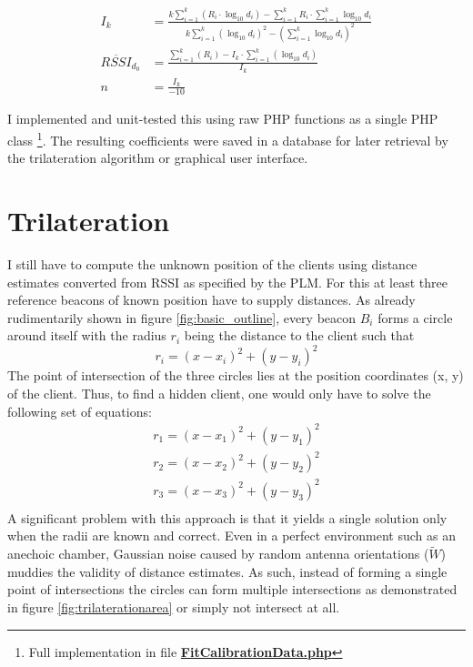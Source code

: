 \documentclass[a4paper, oneside]{ipsreport}
\begin{document}
\begin{equation}
	\label{eq:LSFforcoefficients}
	\begin{split}
		I_k &= \frac{k \sum_{i=1}^k (R_i \cdot \log_{10}{d_i}) - \sum_{i=1}^k R_i \cdot \sum_{i=1}^k \log_{10}{d_i}} {k \sum_{i=1}^k (\log_{10}{d_i})^2 - (\sum_{i=1}^k \log_{10}{d_i})^2} 	\\
		\overline{RSSI}_{d_0} &=  \frac{\sum_{i=1}^k (R_i) - I_k \cdot \sum_{i=1}^k (\log_{10}{d_i})}{I_k}	\\
		n &= \frac{I_k}{-10}
	\end{split}
\end{equation}

I implemented and unit-tested this using raw PHP functions as a single PHP class \footnote{Full implementation in file \bfseries \href{https://gitlab.com/mark-matura/ble-ips-api/-/blob/master/app/Helpers/FitCalibrationData.php}{FitCalibrationData.php}}. The resulting coefficients were saved in a database for later retrieval by the trilateration algorithm or graphical user interface.

\section{Trilateration}
\label{section:trilateration}

I still have to compute the unknown position of the clients using distance estimates converted from RSSI as specified by the PLM. For this at least three reference beacons of known position have to supply distances. As already rudimentarily shown in figure \ref{fig:basic_outline}, every beacon $B_i$ forms a circle around itself with the radius $r_i$ being the distance to the client such that
\begin{equation} \label{eq:radiusofbeacon}
	r_i = (x - x_i)^2 + (y - y_i)^2
\end{equation}
The point of intersection of the three circles lies at the position coordinates (x, y) of the client. Thus, to find a hidden client, one would only have to solve the following set of equations:
\begin{equation}
\label{eq:lineartrilateration}
\begin{split}
	r_1 = (x - x_1)^2 + (y - y_1)^2 \\
	r_2 = (x - x_2)^2 + (y - y_2)^2 \\
	r_3 = (x - x_3)^2 + (y - y_3)^2 \\
\end{split}
\end{equation}
A significant problem with this approach is that it yields a single solution only when the radii are known and correct. Even in a perfect environment such as an anechoic chamber, Gaussian noise caused by random antenna orientations ($\tilde{W}$) muddies the validity of distance estimates. As such, instead of forming a single point of intersections the circles can form multiple intersections as demonstrated in figure \ref{fig:trilaterationarea} or simply not intersect at all.
\end{document}
